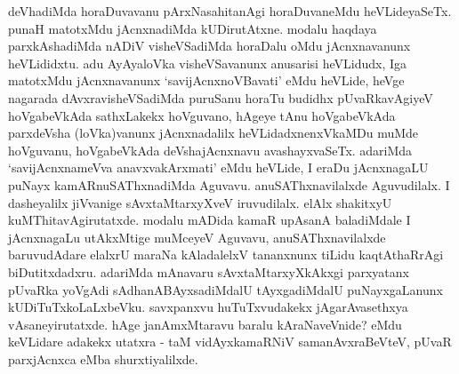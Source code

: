 
\begin{artha}
deVhadiMda horaDuvavanu pArxNasahitanAgi horaDuvaneMdu heVLideyaSeTx. punaH matotxMdu jAcnxnadiMda kUDirutAtxne. modalu haqdaya parxkAshadiMda nADiV visheVSadiMda horaDalu oMdu jAcnxnavanunx heVLididxtu. adu AyAyaloVka visheVSavanunx anusarisi heVLidudx, Iga matotxMdu jAcnxnavanunx `savijAcnxnoVBavati' eMdu heVLide, heVge nagarada dAvxravisheVSadiMda puruSanu horaTu budidhx pUvaRkavAgiyeV hoVgabeVkAda sathxLakekx hoVguvano, hAgeye tAnu hoVgabeVkAda parxdeVsha (loVka)vanunx jAcnxnadalilx heVLidadxnenxVkaMDu muMde hoVguvanu, hoVgabeVkAda deVshajAcnxnavu avashayxvaSeTx. adariMda `savijAcnxnameVva anavxvakArxmati' eMdu heVLide, I eraDu jAcnxnagaLU puNayx kamARnuSAThxnadiMda Aguvavu. anuSAThxnavilalxde Aguvudilalx. I dasheyalilx jiVvanige sAvxtaMtarxyXveV iruvudilalx. elAlx shakitxyU kuMThitavAgirutatxde. modalu mADida kamaR upAsanA baladiMdale I jAcnxnagaLu utAkxMtige muMceyeV Aguvavu, anuSAThxnavilalxde baruvudAdare elalxrU maraNa kAladalelxV tananxnunx tiLidu kaqtAthaRrAgi biDutitxdadxru. adariMda mAnavaru sAvxtaMtarxyXkAkxgi parxyatanx pUvaRka yoVgAdi sAdhanABAyxsadiMdalU tAyxgadiMdalU puNayxgaLanunx kUDiTuTxkoLaLxbeVku. savxpanxvu huTuTxvudakekx jAgarAvasethxya vAsaneyirutatxde. hAge janAmxMtaravu baralu kAraNaveVnide? eMdu keVLidare adakekx utatxra - taM vidAyxkamaRNiV samanAvxraBeVteV, pUvaR parxjAcnxca eMba shurxtiyalilxde.
\end{artha}


